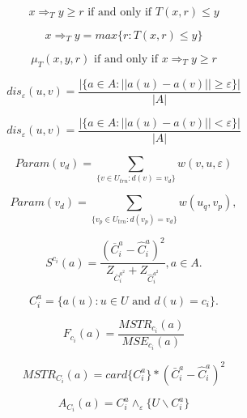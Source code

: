 ﻿\documentclass[a4paper,12pt]{article}
\begin{document}
\begin{displaymath}
	x\Rightarrow_Ty\geq{}r\textrm{ if and only if }T(x,r)\leq{}y
\end{displaymath}

\begin{displaymath}
	x\Rightarrow_Ty = max \{ r:T(x,r)\leq{}y \}
\end{displaymath}

\begin{displaymath}
	\mu_T(x,y,r) \textrm{ if and only if } x\Rightarrow_T y \geq r
\end{displaymath}

\begin{displaymath}
	dis_\varepsilon (u,v) = \frac{ | \{ a\in A: ||a(u) - a(v) || 
	\geq \varepsilon \} | }
	{ |A| }
\end{displaymath}

\begin{displaymath}
	dis_\varepsilon (u,v) = \frac{ | \{ a\in A: ||a(u) - a(v) || 
	< \varepsilon \} | }
	{ |A| }
\end{displaymath}

\begin{displaymath}
	Param(v_d) = \sum_{ \{ v\in U_{trn}:d(v)=v_d  \} } w(v,u,\varepsilon)
\end{displaymath}

\begin{displaymath}
	Param(v_d) = \sum_{ \{ v_p\in U_{trn}:d(v_p)=v_d  \} } w(u_q, v_p),
\end{displaymath}

\begin{displaymath}
	S^{c_i}(a)=\frac{ (\overline{C}^a_i - \hat{C}^a_i )^2 }
	{ Z_{{\overline{C}^{a^2}_i} } + Z_{\hat{C}^{a^2}_i } }, a\in A.
\end{displaymath}

\begin{displaymath}
	C^a_i= \{ a(u):u\in U \textrm{ and } d(u)=c_i\}.
\end{displaymath}

\begin{displaymath}
	F_{c_i}(a)= \frac{MSTR_{c_i}(a)}{MSE_{c_i}(a)}
\end{displaymath}

\begin{displaymath}
	MSTR_{C_i}(a) = card\{ C^a_i \} \ast ( \bar{C}^a_i - \hat{C}^a_i )^2
\end{displaymath}

\begin{displaymath}
	A_{C_i}(a) = C^a_i \wedge_\varepsilon \{U\backslash C^a_i\}
\end{displaymath}
\end{document}
